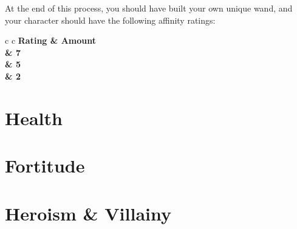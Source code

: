 At the end of this process, you should have built your own unique wand, and your character should have the following affinity ratings:
\begin{center}
	\begin{rndtable}{c c}
	\bf Rating	&	\bf Amount \\
	\emptyCape	&	7 \\
	\oneCape	&	5 \\
	\twoCape	&	2
	\end{rndtable}
\end{center}


\section{Health}


\section{Fortitude}

\section{Heroism \& Villainy}
